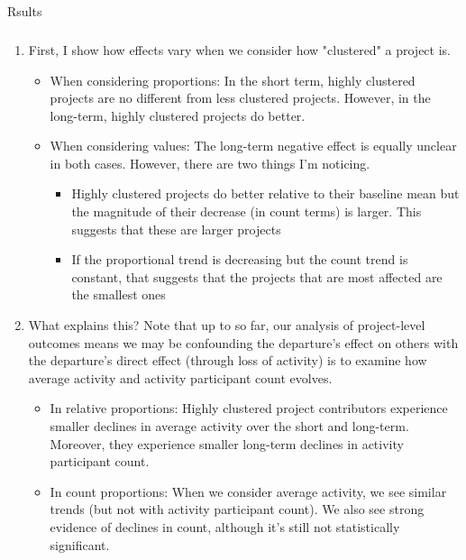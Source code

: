 
\subsection{}
Rsults
\subsubsection{}
\begin{enumerate}
    \item First, I show how effects vary when we consider how "clustered" a project is. 
    \begin{itemize}
        \item When considering proportions: In the short term, highly clustered projects are no different from less clustered projects. However, in the long-term, highly clustered projects do better.
        \item When considering values: The long-term negative effect is equally unclear in both cases. However, there are two things I'm noticing. 
        \begin{itemize}
            \item Highly clustered projects do better relative to their baseline mean but the magnitude of their decrease (in count terms) is larger. This suggests that these are larger projects
            \item If the proportional trend is decreasing but the count trend is constant, that suggests that the projects that are most affected are the smallest ones
        \end{itemize}
    \end{itemize}
    \item What explains this? Note that up to so far, our analysis of project-level outcomes means we may be confounding the departure's effect on others with the departure's direct effect (through loss of activity) is to examine how average activity and activity participant count evolves. 
    \begin{itemize}
        \item In relative proportions: Highly clustered project contributors experience smaller declines in average activity over the short and long-term. Moreover, they experience smaller long-term declines in activity participant count. 
        \item In count proportions: When we consider average activity, we see similar trends (but not with activity participant count). We also see strong evidence of declines in count, although it's still not statistically significant.    

\end{itemize}
\end{enumerate}

